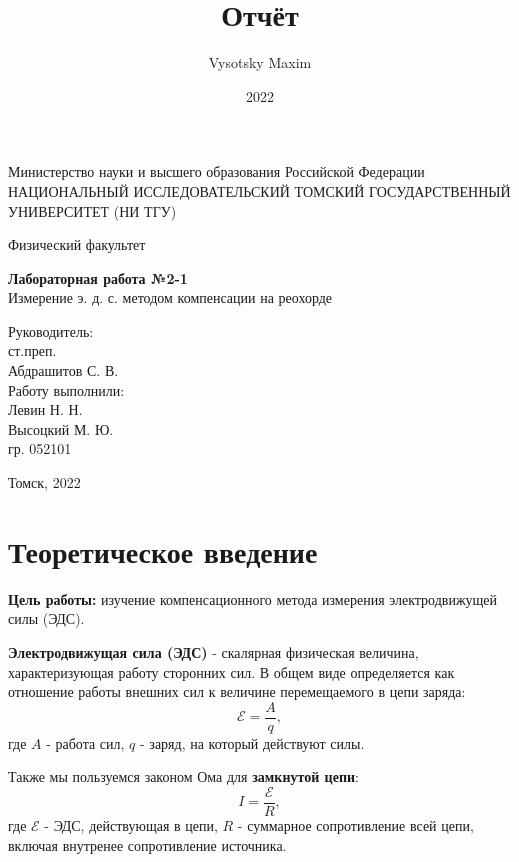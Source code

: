 \documentclass[a4paper,12pt]{article}
\author{Vysotsky Maxim}
\title{Отчёт}
\date{2022}
\begin{document}
	\begin{titlepage}
		\begin{center}
			{Министерство науки и высшего образования Российской Федерации
				НАЦИОНАЛЬНЫЙ ИССЛЕДОВАТЕЛЬСКИЙ ТОМСКИЙ
				ГОСУДАРСТВЕННЫЙ УНИВЕРСИТЕТ (НИ ТГУ)}
		\end{center}
		\begin{center}
			{Физический факультет}
		\end{center}
		
		
		\vspace{8cm}
		{
			\begin{center}
				{\bf Лабораторная работа №2-1}\\
				Измерение э. д. с. методом компенсации на реохорде
			\end{center}
		}
		\vspace{2cm}
		\begin{flushright}
			{Руководитель:\\ ст.преп.\\
				Абдрашитов С. В. \\
				Работу выполнили:\\
				Левин Н. Н. \\
				Высоцкий М. Ю.\\
				\vspace{0.2cm}
				гр. 052101}
		\end{flushright}
		\vspace{3cm}
		\begin{center}
			Томск, 2022
		\end{center}
	\end{titlepage}

\section{Теоретическое введение}
\textbf{Цель работы:} изучение компенсационного метода измерения электродвижущей силы (ЭДС).

\textbf{Электродвижущая сила (ЭДС)} - скалярная физическая величина, характеризующая работу сторонних сил. В общем виде определяется как отношение работы внешних сил к величине перемещаемого в цепи заряда:
$$\mathcal{E} = \frac{A}{q},$$
где $A$ - работа сил, $q$ - заряд, на который действуют силы.

Также мы пользуемся законом Ома для \textbf{замкнутой цепи}:
\begin{equation}\label{Om}
	I = \frac{\mathcal{E}}{R},
\end{equation}	
где $\mathcal{E}$ - ЭДС, действующая в цепи, $R$ - суммарное сопротивление всей цепи, включая внутренее сопротивление источника.
\end{document}
